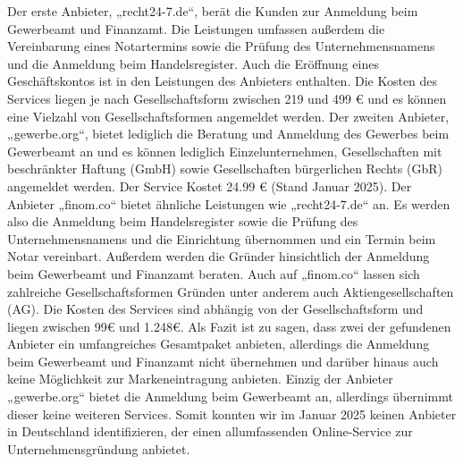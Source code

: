 Der erste Anbieter, „recht24-7.de“, berät die Kunden zur Anmeldung beim Gewerbeamt und Finanzamt. Die Leistungen umfassen außerdem die Vereinbarung eines Notartermins sowie die Prüfung des Unternehmensnamens und die Anmeldung beim Handelsregister. Auch die Eröffnung eines Geschäftskontos ist in den Leistungen des Anbieters enthalten. Die Kosten des Services liegen je nach Gesellschaftsform zwischen 219 und 499 € und es können eine Vielzahl von Gesellschaftsformen angemeldet werden. 
Der zweiten Anbieter, „gewerbe.org“, bietet lediglich die Beratung und Anmeldung des Gewerbes beim Gewerbeamt an und es können lediglich Einzelunternehmen, Gesellschaften mit beschränkter Haftung (GmbH) sowie Gesellschaften bürgerlichen Rechts (GbR) angemeldet werden. Der Service Kostet 24.99 € (Stand Januar 2025). 
Der Anbieter „finom.co“ bietet ähnliche Leistungen wie „recht24-7.de“ an. Es werden also die Anmeldung beim Handelsregister sowie die Prüfung des Unternehmensnamens und die Einrichtung übernommen und ein Termin beim Notar vereinbart. Außerdem werden die Gründer hinsichtlich der Anmeldung beim Gewerbeamt und Finanzamt beraten. Auch auf „finom.co“ lassen sich zahlreiche Gesellschaftsformen Gründen unter anderem auch Aktiengesellschaften (AG). Die Kosten des Services sind abhängig von der Gesellschaftsform und liegen zwischen 99€ und 1.248€.
Als Fazit ist zu sagen, dass zwei der gefundenen Anbieter ein umfangreiches Gesamtpaket anbieten, allerdings die Anmeldung beim Gewerbeamt und Finanzamt nicht übernehmen und darüber hinaus auch keine Möglichkeit zur Markeneintragung anbieten. Einzig der Anbieter „gewerbe.org“ bietet die Anmeldung beim Gewerbeamt an, allerdings übernimmt dieser keine weiteren Services. Somit konnten wir im Januar 2025 keinen Anbieter in Deutschland identifizieren, der einen allumfassenden Online-Service zur Unternehmensgründung anbietet. 
